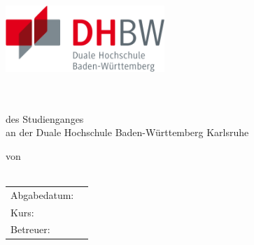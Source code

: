 
\newcommand{\logodhbw}{\includegraphics[width=6cm]{kapitel/offizielles/img/dhbw}}

\begin{titlepage}
	\sffamily
	
	\logodhbw \hfill \logocas \\[2ex]
	
	\begin{center}
		\huge{\textsc{\textbf{\theTitle}}}
		\\[6ex]
		\Large{\textbf{\theSubtitle}}
		\\
		\Large{des Studienganges \studiengang}
		\\
		\Large{an der Duale Hochschule Baden-Württemberg Karlsruhe}
		\\[7ex]
		
		\normalsize{
			von
			\\
			\theAuthor
			\\[15ex]
			
			\begin{tabular}{ll}
				Abgabedatum:		& \quad \deadline \\
				Kurs:				& \quad \kurs \\ 
				Betreuer:			& \quad \supervisor \\
			\end{tabular}
		}
	\end{center}
\end{titlepage}